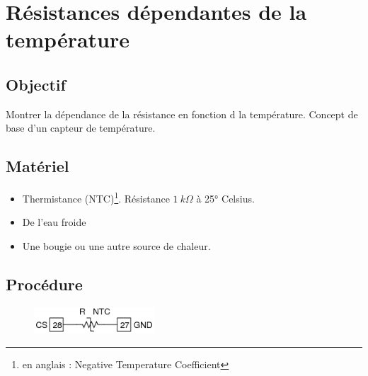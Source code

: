 \documentclass{book}
\begin{document}




\section{Résistances dépendantes de la température}



\subsection{Objectif}


Montrer la dépendance de la résistance en fonction d la température. Concept de base d'un capteur de température.




\subsection{Matériel}


\begin{itemize}
  \item Thermistance (NTC)\footnote{en anglais : Negative Temperature Coefficient}. Résistance $1\ k\Omega$  à 25° Celsius.
  \item De l'eau froide
  \item Une bougie ou une autre source de chaleur.
\end{itemize}

\subsection{Procédure}


\begin{figure}[h!]
\begin{center}
\caption{\label{} }\vspace{0.5em}
\includegraphics[width=0.4\textwidth, height=0.3\textwidth, keepaspectratio]{Schematic-ntc.png}
\end{center}
\end{figure}
\end{document}
